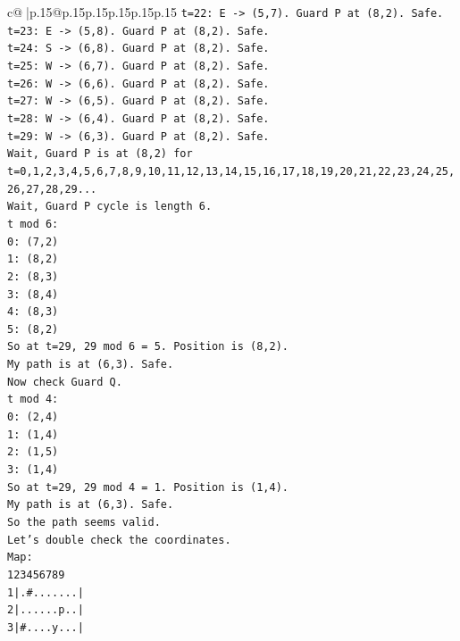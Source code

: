 \documentclass{article}
\begin{document}
{\begin{supertabular}{c@{$\;$}|p{.15\linewidth}@{}p{.15\linewidth}p{.15\linewidth}p{.15\linewidth}p{.15\linewidth}p{.15\linewidth}}
{{{\texttt{t=22: E {-}> (5,7). Guard P at (8,2). Safe.} \\
\texttt{t=23: E {-}> (5,8). Guard P at (8,2). Safe.} \\
\texttt{t=24: S {-}> (6,8). Guard P at (8,2). Safe.} \\
\texttt{t=25: W {-}> (6,7). Guard P at (8,2). Safe.} \\
\texttt{t=26: W {-}> (6,6). Guard P at (8,2). Safe.} \\
\texttt{t=27: W {-}> (6,5). Guard P at (8,2). Safe.} \\
\texttt{t=28: W {-}> (6,4). Guard P at (8,2). Safe.} \\
\texttt{t=29: W {-}> (6,3). Guard P at (8,2). Safe.} \\
\texttt{Wait, Guard P is at (8,2) for t=0,1,2,3,4,5,6,7,8,9,10,11,12,13,14,15,16,17,18,19,20,21,22,23,24,25,26,27,28,29...} \\
\texttt{Wait, Guard P cycle is length 6.} \\
\texttt{t mod 6:} \\
\texttt{0: (7,2)} \\
\texttt{1: (8,2)} \\
\texttt{2: (8,3)} \\
\texttt{3: (8,4)} \\
\texttt{4: (8,3)} \\
\texttt{5: (8,2)} \\
\texttt{So at t=29, 29 mod 6 = 5. Position is (8,2).} \\
\texttt{My path is at (6,3). Safe.} \\
\texttt{Now check Guard Q.} \\
\texttt{t mod 4:} \\
\texttt{0: (2,4)} \\
\texttt{1: (1,4)} \\
\texttt{2: (1,5)} \\
\texttt{3: (1,4)} \\
\texttt{So at t=29, 29 mod 4 = 1. Position is (1,4).} \\
\texttt{My path is at (6,3). Safe.} \\
\texttt{So the path seems valid.} \\
\texttt{Let's double check the coordinates.} \\
\texttt{Map:} \\
\texttt{123456789} \\
\texttt{1|.\#.......|} \\
\texttt{2|......p..|} \\
\texttt{3|\#....y...|} \\
}}}
\end{supertabular}}
\end{document}
